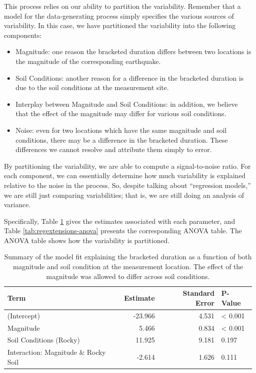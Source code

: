 \documentclass[]{book}
\providecommand{\tightlist}{%
  \setlength{\itemsep}{0pt}\setlength{\parskip}{0pt}}
\theoremstyle{plain}
\theoremstyle{mydefn}
\theoremstyle{myexmpl}
\theoremstyle{remark}
\begin{document}
This process relies on our ability to partition the variability.
Remember that a model for the data-generating process simply specifies
the various sources of variability. In this case, we have partitioned
the variability into the following components:

\begin{itemize}
\tightlist
\item
  Magnitude: one reason the bracketed duration differs between two
  locations is the magnitude of the corresponding earthquake.
\item
  Soil Conditions: another reason for a difference in the bracketed
  duration is due to the soil conditions at the measurement site.
\item
  Interplay between Magnitude and Soil Conditions: in addition, we
  believe that the effect of the magnitude may differ for various soil
  conditions.
\item
  Noise: even for two locations which have the same magnitude and soil
  conditions, there may be a difference in the bracketed duration. These
  differences we cannot resolve and attribute them simply to error.
\end{itemize}

By partitioning the variability, we are able to compute a
signal-to-noise ratio. For each component, we can essentially determine
how much variability is explained relative to the noise in the process.
So, despite talking about ``regression models,'' we are still just
comparing variabilities; that is, we are still doing an analysis of
variance.

Specifically, Table \ref{tab:regextensions-fit} gives the estimates
associated with each parameter, and Table \ref{tab:regextensions-anova}
presents the corresponding ANOVA table. The ANOVA table shows how the
variability is partitioned.

\begin{table}

\caption{\label{tab:regextensions-fit}Summary of the model fit explaining the bracketed duration as a function of both magnitude and soil condition at the measurement location.  The effect of the magnitude was allowed to differ across soil conditions.}
\centering
\begin{tabular}[t]{l|r|r|l}
\hline
Term & Estimate & Standard Error & P-Value\\
\hline
(Intercept) & -23.966 & 4.531 & < 0.001\\
\hline
Magnitude & 5.466 & 0.834 & < 0.001\\
\hline
Soil Conditions (Rocky) & 11.925 & 9.181 & 0.197\\
\hline
Interaction: Magnitude \& Rocky Soil & -2.614 & 1.626 & 0.111\\
\hline
\end{tabular}
\end{table}
\end{document}
